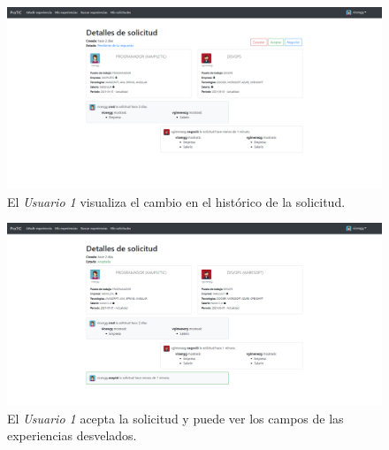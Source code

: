 \documentclass[a4paper, 12pt]{book}
\begin{document}
    \begin{figure}
        \centering
        \includegraphics[width=15cm, keepaspectratio]{img/6.5.png}
        \caption{El \emph{Usuario 1} visualiza el cambio en el histórico de la solicitud.}
        \label{fig:use_cases_6_5}
    \end{figure}

    \begin{figure}
        \centering
        \includegraphics[width=15cm, keepaspectratio]{img/6.6.png}
        \caption{El \emph{Usuario 1} acepta la solicitud y puede ver los campos de las experiencias desvelados.}
        \label{fig:use_cases_6_6}
    \end{figure}
\end{document}
